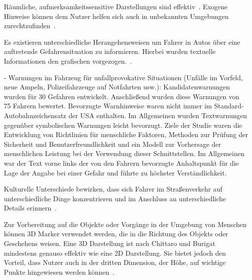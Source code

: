 
Räumliche, aufmerksamkeitssensitive Darstellungen sind effektiv~\cite{bonanni2005attention}. Exogene Hinweise können dem Nutzer helfen sich auch in unbekannten Umgebungen zurechtzufinden~\cite{bonanni2005attention}.

Es existieren unterschiedliche Herangehensweisen um Fahrer in Autos über eine auftretende Gefahrensituation zu informieren. Hierbei wurden textuelle Informationen den grafischen vorgezogen.~\cite{green1995driver}.

-\cite{green1995driver}
Warnungen im Fahrzeug für unfallprovokative Situationen (Unfälle im Vorfeld, neue Ampeln, Polizeifahrzeuge auf Notfahrten usw.): Kandidatenwarnungen wurden für 30 Gefahren entwickelt. Anschließend wurden diese Warnungen von 75 Fahrern bewertet. Bevorzugte Warnhinweise waren nicht immer im Standard-Autobahnzeichensatz der USA enthalten. Im Allgemeinen wurden Textwarnungen gegenüber symbolischen Warnungen leicht bevorzugt. Ziele der Studie waren die Entwicklung von Richtlinien für menschliche Faktoren, Methoden zur Prüfung der Sicherheit und Benutzerfreundlichkeit und ein Modell zur Vorhersage der menschlichen Leistung bei der Verwendung dieser Schnittstellen. Im Allgemeinen war der Text vorne links der von den Fahrern bevorzugte Anhaltspunkt für die Lage der Angabe bei einer Gefahr und führte zu höchster Verständlichkeit.

Kulturelle Unterschiede bewirken, dass sich Fahrer im Straßenverkehr auf unterschiedliche Dinge konzentrieren und im Anschluss an unterschiedliche Details erinnern~\cite{shinohara2017visual}.

Zur Vorbereitung auf die Objekte oder Vorgänge in der Umgebung von Menschen können 3D Marker verwendet werden, die in die Richtung des Objekts oder Geschehens weisen. Eine 3D Darstellung ist nach Chittaro und Burigat mindestens genauso effektiv wie eine 2D Darstellung. Sie bietet jedoch den Vorteil, dass Nutzer auch in der dritten Dimension, der Höhe, auf wichtige Punkte hingewiesen werden können~\cite{chittaro20043d}.\\
